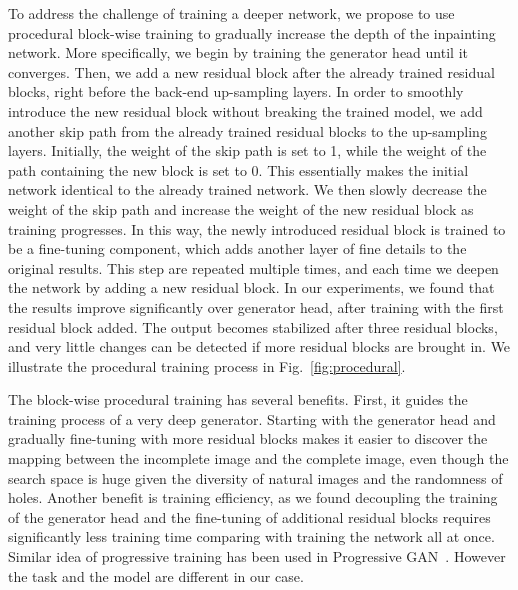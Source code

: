 To address the challenge of training a deeper network, we propose to use procedural block-wise training to gradually increase the depth of the inpainting network. More specifically, we begin by training the generator head until it converges. Then, we add a new residual block after the already trained residual blocks, right before the back-end up-sampling layers. In order to smoothly introduce the new residual block without breaking the trained model, we add another skip path from the already trained residual blocks to the up-sampling layers. Initially, the weight of the skip path is set to 1, while the weight of the path containing the new block is set to 0. This essentially makes the initial network identical to the already trained network. We then slowly decrease the weight of the skip path and increase the weight of the new residual block as training progresses. In this way, the newly introduced residual block is trained to be a fine-tuning component, which adds another layer of fine details to the original results. This step are repeated multiple times, and each time we deepen the network by adding a new residual block. In our experiments, we found that the results improve significantly over generator head, after training with the first residual block added. The output becomes stabilized after three residual blocks, and very little changes can be detected if more residual blocks are brought in. We illustrate the procedural training process in Fig.~\ref{fig:procedural}.

The block-wise procedural training has several benefits. First, it guides the training process of a very deep generator. Starting with the generator head and gradually fine-tuning with more residual blocks makes it easier to discover the mapping between the incomplete image and the complete image, even though the search space is huge given the diversity of natural images and the randomness of holes. Another benefit is training efficiency, as we found decoupling the training of the generator head and the fine-tuning of additional residual blocks requires significantly less training time comparing with training the network all at once. Similar idea of progressive training has been used in Progressive GAN~\cite{karras2017progressive}. However the task and the model are different in our case.

